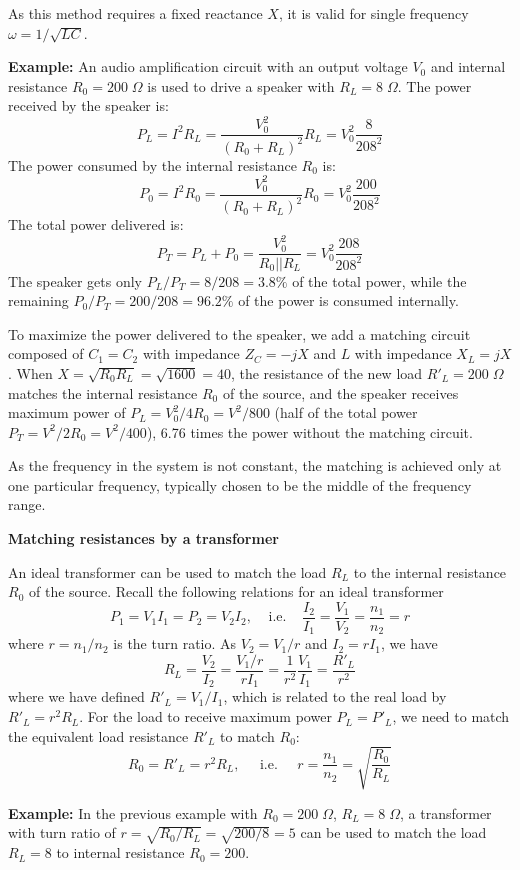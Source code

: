 As this method requires a fixed reactance $X$, it is valid for single
frequency $\omega=1/\sqrt{LC}$.

{\bf Example:} An audio amplification circuit with an output voltage $V_0$
and internal resistance $R_0=200\;\Omega$ is used to drive a speaker with 
$R_L=8\;\Omega$. 
The power received by the speaker is:
\[ P_L=I^2R_L=\frac{V_0^2}{(R_0+R_L)^2}R_L=V_0^2\frac{8}{208^2} \]
The power consumed by the internal resistance $R_0$ is:
\[ P_0=I^2R_0=\frac{V_0^2}{(R_0+R_L)^2}R_0=V_0^2\frac{200}{208^2} \]
The total power delivered is:
\[ P_T=P_L+P_0=\frac{V_0^2}{R_0 || R_L} =V_0^2\frac{208}{208^2} \]
The speaker gets only $P_L/P_T=8/208=3.8\%$ of the total power, while the 
remaining $P_0/P_T=200/208=96.2\%$ of the power is consumed internally. 

To maximize the power delivered to the speaker, we add a matching circuit 
composed of $C_1=C_2$ with impedance $Z_C=-jX$ and $L$ with impedance 
$X_L=jX$. When $X=\sqrt{R_0R_L}=\sqrt{1600}=40$, the resistance of the new
load $R'_L=200\;\Omega$ matches the internal resistance $R_0$ of the source,
and the speaker receives maximum power of $P_L=V_0^2/4R_0=V^2/800$ (half of
the total power $P_T=V^2/2R_0=V^2/400$), 6.76 times the power without
the matching circuit. 

As the frequency in the system is not constant, the matching is achieved
only at one particular frequency, typically chosen to be the middle of
the frequency range. 

{\bf Matching resistances by a transformer}

An ideal transformer can be used to match the load $R_L$ to the internal 
resistance $R_0$ of the source. Recall the following relations for an ideal 
transformer
\[
P_1=V_1I_1=P_2=V_2I_2,\;\;\;\;\mbox{i.e.}\;\;\;\;
\frac{I_2}{I_1}=\frac{V_1}{V_2}=\frac{n_1}{n_2}=r	
\]
where $r=n_1/n_2$ is the turn ratio. As $V_2=V_1/r$ and $I_2=rI_1$, we have 
\[ 
R_L=\frac{V_2}{I_2}=\frac{V_1/r}{rI_1}=\frac{1}{r^2}\frac{V_1}{I_1}
=\frac{R'_L}{r^2}
\]
where we have defined $R'_L=V_1/I_1$, which is related to the real load by
$R'_L=r^2 R_L$. For the load to receive maximum power $P_L=P'_L$, we need to 
match the equivalent load resistance $R'_L$ to match $R_0$:
\[ 
R_0=R'_L=r^2 R_L,\;\;\;\;\;\mbox{i.e.}\;\;\;\;\;
r=\frac{n_1}{n_2}=\sqrt{\frac{R_0}{R_L}} 
\]


{\bf Example:} In the previous example with $R_0=200\;\Omega$, 
$R_L=8\;\Omega$, a transformer with turn ratio of 
$r=\sqrt{R_0/R_L}=\sqrt{200/8}=5$ can be used to match the load
$R_L=8$ to internal resistance $R_0=200$.




